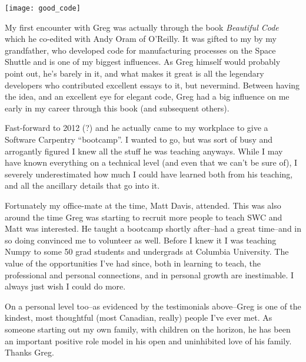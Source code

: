 
\newpage
\vspace*{\fill}
\begin{minipage}{0.45\textwidth}
    \texttt{[image: good\_code]}
\end{minipage}
\hfill
\begin{minipage}{0.45\textwidth}
\setlength{\parindent}{0in}
\setlength{\parskip}{1em}
My first encounter with Greg was actually through the book \textit{Beautiful
Code} which he co-edited with Andy Oram of O'Reilly.  It was gifted to my
by my grandfather, who developed code for manufacturing processes on the
Space Shuttle and is one of my biggest influences.  As Greg himself would
probably point out, he's barely in it, and what makes it great is all the
legendary developers who contributed excellent essays to it, but nevermind.
Between having the idea, and an excellent eye for elegant code, Greg had a
big influence on me early in my career through this book (and subsequent
others).

Fast-forward to 2012 (?) and he actually came to my workplace to give a
Software Carpentry ``bootcamp''. I wanted to go, but was sort of busy and
arrogantly figured I knew all the stuff he was teaching anyways.  While I
may have known everything on a technical level (and even that we can't be
sure of), I severely underestimated how much I could have learned both from
his teaching, and all the ancillary details that go into it.

Fortunately my office-mate at the time, Matt Davis, attended.  This was
also around the time Greg was starting to recruit more people to teach SWC
and Matt was interested.  He taught a bootcamp shortly after--had a great
time--and in so doing convinced me to volunteer as well.  Before I knew it
I was teaching Numpy to some 50 grad students and undergrads at Columbia
University.  The value of the opportunities I've had since, both in
learning to teach, the professional and personal connections, and in
personal growth are inestimable.  I always just wish I could do more.

On a personal level too--as evidenced by the testimonials above--Greg is
one of the kindest, most thoughtful (most Canadian, really) people I've ever
met.  As someone starting out my own family, with children on the horizon,
he has been an important positive role model in his open and uninhibited
love of his family.  Thanks Greg.

 \\
\end{minipage}
\vspace*{\fill}

